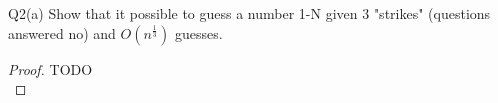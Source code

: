 \begin{problem}
  {Q2(a)}
  Show that it possible to guess a number 1-N given 3 "strikes" (questions answered no) and $O(n^{\frac{1}{3}})$ guesses. \\
  \begin{proof}
    TODO\\
  \end{proof}
\end{problem}

